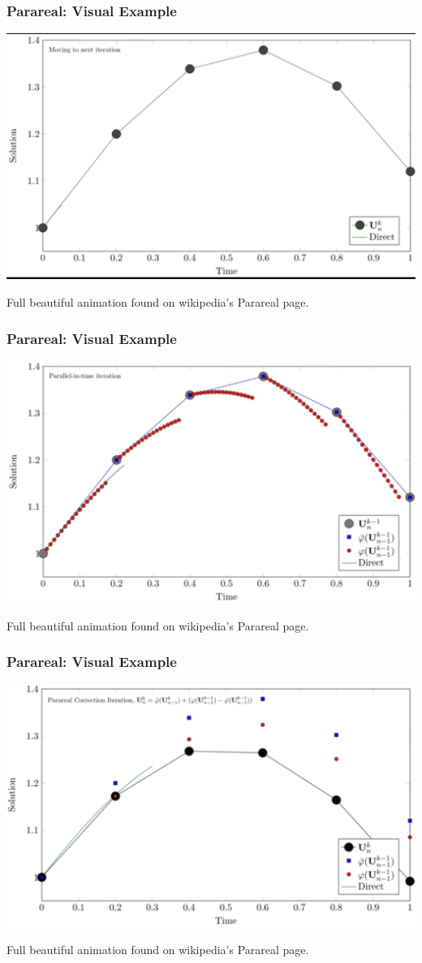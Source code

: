 \documentclass[pdf,12pt]{beamer}
\begin{document}
\begin{frame}
  \frametitle{Parareal: Visual Example}
  \begin{center}
    \includegraphics[width=.9\textwidth]{./resources/Parareal1}
  \end{center}
  Full beautiful animation found on wikipedia's Parareal page.
\end{frame}
\begin{frame}
  \frametitle{Parareal: Visual Example}
  \begin{center}
    \includegraphics[width=.9\textwidth]{./resources/Parareal2}
  \end{center}
  Full beautiful animation found on wikipedia's Parareal page.
\end{frame}
\begin{frame}
  \frametitle{Parareal: Visual Example}
  \begin{center}
    \includegraphics[width=.9\textwidth]{./resources/Parareal3}
  \end{center}
  Full beautiful animation found on wikipedia's Parareal page.
\end{frame}
\end{document}
